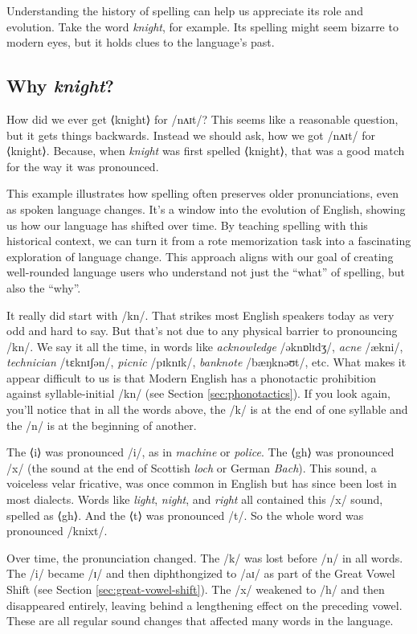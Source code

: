 Understanding the history of spelling can help us appreciate its role and evolution. Take the word \textit{knight}, for example. Its spelling might seem bizarre to modern eyes, but it holds clues to the language's past.

\subsection{Why \textit{knight}?}

How did we ever get ⟨knight⟩ for /nʌɪt/? This seems like a reasonable question, but it gets things backwards. Instead we should ask, how we got /nʌɪt/ for ⟨knight⟩. Because, when \textit{knight} was first spelled ⟨knight⟩, that was a good match for the way it was pronounced.

This example illustrates how spelling often preserves older pronunciations, even as spoken language changes. It's a window into the evolution of English, showing us how our language has shifted over time. By teaching spelling with this historical context, we can turn it from a rote memorization task into a fascinating exploration of language change. This approach aligns with our goal of creating well-rounded language users who understand not just the ``what'' of spelling, but also the ``why''.

It really did start with /kn/. That strikes most English speakers today as very odd and hard to say. But that's not due to any physical barrier to pronouncing /kn/. We say it all the time, in words like \textit{acknowledge} /əknɒlɪdʒ/, \textit{acne} /ækni/, \textit{technician} /tɛknɪʃən/, \textit{picnic} /pɪknɪk/, \textit{banknote} /bæŋknəʊt/, etc. What makes it appear difficult to us is that Modern English has a phonotactic prohibition against syllable-initial /kn/ (see Section \ref{sec:phonotactics}). If you look again, you'll notice that in all the words above, the /k/ is at the end of one syllable and the /n/ is at the beginning of another.

The ⟨i⟩ was pronounced /i/, as in \textit{machine} or \textit{police}. The ⟨gh⟩ was pronounced /x/ (the sound at the end of Scottish \textit{loch} or German \textit{Bach}). This sound, a voiceless velar fricative, was once common in English but has since been lost in most dialects. Words like \textit{light}, \textit{night}, and \textit{right} all contained this /x/ sound, spelled as ⟨gh⟩. And the ⟨t⟩ was pronounced /t/. So the whole word was pronounced /knixt/.

Over time, the pronunciation changed. The /k/ was lost before /n/ in all words. The /i/ became /ɪ/ and then diphthongized to /aɪ/ as part of the Great Vowel Shift (see Section \ref{sec:great-vowel-shift}). The /x/ weakened to /h/ and then disappeared entirely, leaving behind a lengthening effect on the preceding vowel. These are all regular sound changes that affected many words in the language.

